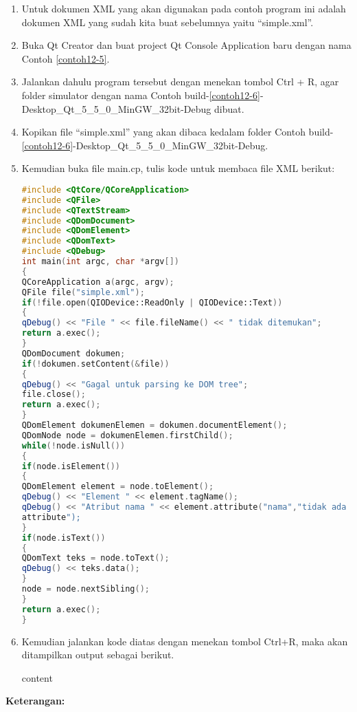 \begin{enumerate}

\item
  Untuk dokumen XML yang akan digunakan pada contoh program ini adalah
  dokumen XML yang sudah kita buat sebelumnya yaitu ``simple.xml''.
\item
  Buka Qt Creator dan buat project Qt Console Application baru dengan
  nama Contoh \ref{contoh12-5}.
\item
  Jalankan dahulu program tersebut dengan menekan tombol Ctrl + R, agar
  folder simulator dengan nama Contoh build-\ref{contoh12-6}-Desktop\_Qt\_5\_5\_0\_MinGW\_32bit-Debug dibuat.
\item
  Kopikan file ``simple.xml'' yang akan dibaca kedalam folder Contoh
  build-\ref{contoh12-6}-Desktop\_Qt\_5\_5\_0\_MinGW\_32bit-Debug.
\item
  Kemudian buka file main.cp, tulis kode untuk membaca file XML berikut:

\begin{lstlisting}[language=c++, caption=Contoh Membaca DOM dari dokumen XML, label=contoh12-6]
#include <QtCore/QCoreApplication>
#include <QFile>
#include <QTextStream>
#include <QDomDocument>
#include <QDomElement>
#include <QDomText>
#include <QDebug>
int main(int argc, char *argv[])
{
QCoreApplication a(argc, argv);
QFile file("simple.xml");
if(!file.open(QIODevice::ReadOnly | QIODevice::Text))
{
qDebug() << "File " << file.fileName() << " tidak ditemukan";
return a.exec();
}
QDomDocument dokumen;
if(!dokumen.setContent(&file))
{
qDebug() << "Gagal untuk parsing ke DOM tree";
file.close();
return a.exec();
}
QDomElement dokumenElemen = dokumen.documentElement();
QDomNode node = dokumenElemen.firstChild();
while(!node.isNull())
{
if(node.isElement())
{
QDomElement element = node.toElement();
qDebug() << "Element " << element.tagName();
qDebug() << "Atribut nama " << element.attribute("nama","tidak ada
attribute");
}
if(node.isText())
{
QDomText teks = node.toText();
qDebug() << teks.data();
}
node = node.nextSibling();
}
return a.exec();
}
\end{lstlisting}
\item
  Kemudian jalankan kode diatas dengan menekan tombol Ctrl+R, maka akan
  ditampilkan output sebagai berikut.
  
  \begin{lcverbatim}
  	content
  \end{lcverbatim}
\end{enumerate}

\textbf{Keterangan:}

